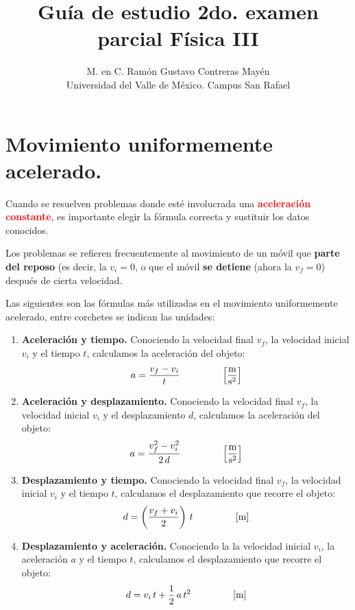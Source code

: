 \documentclass[14pt]{extarticle}
\title{\vspace*{-2cm} Guía de estudio 2do. examen parcial  Física III}
\author{M. en C. Ramón Gustavo Contreras Mayén \\ {\fontsize{14}{14}\selectfont Universidad del Valle de México. Campus San Rafael}}
\date{}
\newcommand{\textocolor}[2]{\textbf{\textcolor{#1}{#2}}}
\begin{document}
\maketitle


\section{Movimiento uniformemente acelerado.}

Cuando se resuelven problemas donde esté involucrada una \textocolor{red}{aceleración constante},  es importante elegir la fórmula correcta y sustituir los datos conocidos.

Los problemas se refieren frecuentemente al movimiento de un móvil que \textocolor{ao}{parte del reposo} (es decir, la $v_{i} = 0$, o que el móvil \textocolor{cadmiumgreen}{se detiene} (ahora la $v_{f} = 0$) después de cierta velocidad.

Las siguientes son las fórmulas más utilizadas en el movimiento uniformemente acelerado, entre corchetes se indican las unidades:
\begin{enumerate}
\item \textbf{Aceleración y tiempo. }Conociendo la velocidad final $v_{f}$, la velocidad inicial $v_{i}$ y el tiempo $t$, calculamos la aceleración del objeto:
\begin{align*}
a = \dfrac{v_{f} - v_{i}}{t} \hspace*{1.5cm} \left[ \dfrac{\unit{\meter}}{\unit{\square\second}} \right]
\end{align*}
\item \textbf{Aceleración y desplazamiento. } Conociendo la velocidad final $v_{f}$, la velocidad inicial $v_{i}$ y el desplazamiento $d$, calculamos la aceleración del objeto:
\begin{align*}
a = \dfrac{v_{f}^{2} - v_{i}^{2}}{2 \, d} \hspace*{1.5cm} \left[ \dfrac{\unit{\meter}}{\unit{\square\second}} \right]
\end{align*}
\item \textbf{Desplazamiento y tiempo. } Conociendo la velocidad final $v_{f}$, la velocidad inicial $v_{i}$ y el tiempo $t$, calculamos el desplazamiento que recorre el objeto:
\begin{align*}
d = \left( \dfrac{v_{f} + v_{i}}{2} \right) \, t \hspace*{1.5cm} \left[ \unit{\meter} \right]
\end{align*}
\item \textbf{Desplazamiento y aceleración. } Conociendo la la velocidad inicial $v_{i}$, la aceleración $a$ y el tiempo $t$, calculamos el desplazamiento que recorre el objeto:
\begin{align*}
d = v_{i} \, t + \dfrac{1}{2} \, a \, t^{2} \hspace*{1.5cm} \left[ \unit{\meter} \right]
\end{align*}
\end{enumerate}
\end{document}
